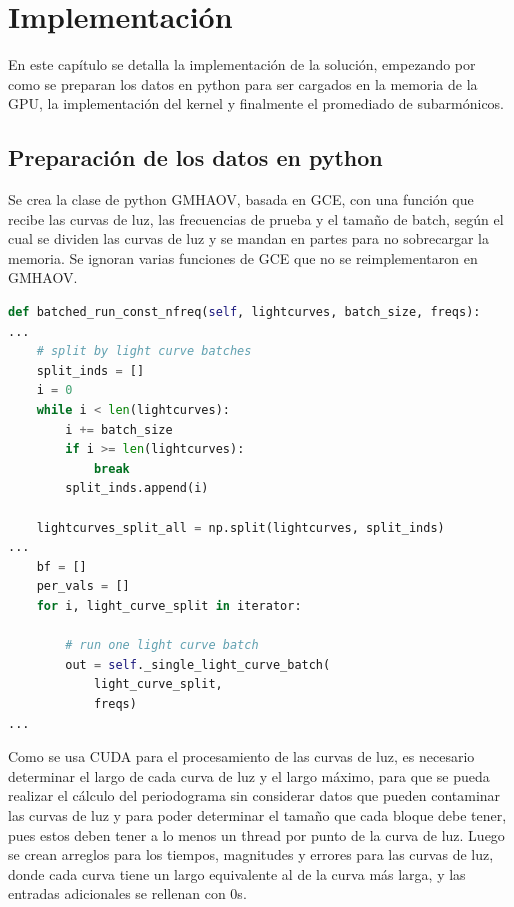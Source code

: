 \chapter{Implementación}\label{chap:implementación}
En este capítulo se detalla la implementación de la solución, empezando por como se preparan los datos en python para ser cargados en la memoria de la GPU, la implementación del kernel y finalmente el promediado de subarmónicos.
\section{Preparación de los datos en python}\label{sec:preparacion-datos}
Se crea la clase de python GMHAOV, basada en GCE, con una función que recibe las curvas de luz, las frecuencias de prueba y el tamaño de batch, según el cual se dividen las curvas de luz y se mandan en partes para no sobrecargar la memoria. Se ignoran varias funciones de GCE que no se reimplementaron en GMHAOV.
\begin{lstlisting}[language=Python]
def batched_run_const_nfreq(self, lightcurves, batch_size, freqs):
...
    # split by light curve batches
    split_inds = []
    i = 0
    while i < len(lightcurves):
        i += batch_size
        if i >= len(lightcurves):
            break
        split_inds.append(i)

    lightcurves_split_all = np.split(lightcurves, split_inds)
...
    bf = []
    per_vals = []
    for i, light_curve_split in iterator:

        # run one light curve batch
        out = self._single_light_curve_batch(
            light_curve_split,
            freqs)
...
\end{lstlisting}
Como se usa CUDA para el procesamiento de las curvas de luz, es necesario determinar el largo de cada curva de luz y el largo máximo, para que se pueda realizar el cálculo del periodograma sin considerar datos que pueden contaminar las curvas de luz y para poder determinar el tamaño que cada bloque debe tener, pues estos deben tener a lo menos un thread por punto de la curva de luz. Luego se crean arreglos para los tiempos, magnitudes y errores para las curvas de luz, donde cada curva tiene un largo equivalente al de la curva más larga, y las entradas adicionales se rellenan con $0$s.

